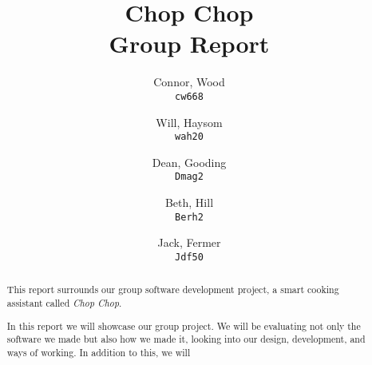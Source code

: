 \documentclass{article}
\title{%
Chop Chop \\
  \large Group Report}
\author{
  Connor, Wood\\
  \texttt{cw668}
  \and
  Will, Haysom\\
  \texttt{wah20}
  \and
  Dean, Gooding\\
  \texttt{Dmag2}
  \and
  Beth, Hill\\
  \texttt{Berh2}
  \and
  Jack, Fermer\\
  \texttt{Jdf50}
}
\begin{document}
  \maketitle

  \pagebreak


  \begin{abstract}
      This report surrounds our group software development project, a smart cooking assistant called \emph{Chop Chop}. 
    
      In this report we will showcase our group project. We will be evaluating not only the software we made but also how we made it, looking into our design, development, and ways of working. In addition to this, we will 
  \end{abstract}

  \pagebreak

  \tableofcontents

  \pagebreak

\end{document}
